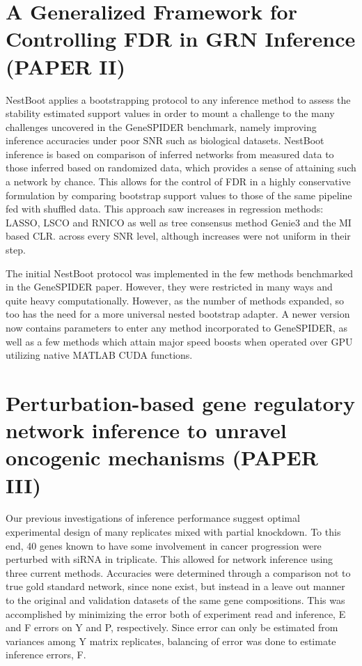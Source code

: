\section{A Generalized Framework for Controlling FDR in GRN Inference (PAPER II)}

NestBoot applies a bootstrapping protocol to any inference method to assess the stability estimated support values in order to mount a challenge to the many challenges uncovered in the GeneSPIDER benchmark, namely improving inference accuracies under poor SNR such as biological datasets. NestBoot inference is based on comparison of inferred networks from measured data to those inferred based on randomized data, which provides a sense of attaining such a network by chance. This allows for the control of FDR in a highly conservative formulation by comparing bootstrap support values to those of the same pipeline fed with shuffled data. This approach saw increases in regression methods: LASSO, LSCO and RNICO as well as tree consensus method Genie3 and the MI based CLR. across every SNR level, although increases were not uniform in their step.

The initial NestBoot protocol was implemented in the few methods benchmarked in the GeneSPIDER paper. However, they were restricted in many ways and quite heavy computationally. However, as the number of methods expanded, so too has the need for a more universal nested bootstrap adapter. A newer version now contains parameters to enter any method incorporated to GeneSPIDER, as well as a few methods which attain major speed boosts when operated over GPU utilizing native MATLAB CUDA functions. 

\section{Perturbation-based gene regulatory network inference to unravel oncogenic mechanisms (PAPER III)}

Our previous investigations of inference performance suggest optimal experimental design of many replicates mixed with partial knockdown. To this end, 40 genes known to have some involvement in cancer progression were perturbed with siRNA in triplicate. This allowed for network inference using three current methods. Accuracies were determined through a comparison not to true gold standard network, since none exist, but instead in a leave out manner to the original and validation datasets of the same gene compositions. This was accomplished by minimizing the error both of experiment read and inference, \ie E and F errors on Y and P, respectively. Since error can only be estimated from variances among Y matrix replicates, balancing of error was done to estimate inference errors, F.

